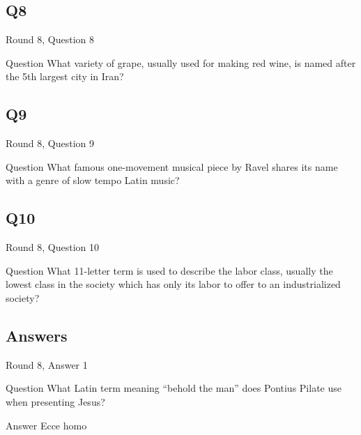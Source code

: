 \documentclass[11pt]{beamer}
\begin{document}
\subsection*{Q8}
\begin{frame}[t]{Round 8, Question 8}
\vspace{2em}
\begin{block}{Question}
What variety of grape, usually used for making red wine, is named after the 5th largest city in Iran\@?
\end{block}
\end{frame}
    

\subsection*{Q9}
\begin{frame}[t]{Round 8, Question 9}
\vspace{2em}
\begin{block}{Question}
What famous one-movement musical piece by Ravel shares its name with a genre of slow tempo Latin music\@?
\end{block}
\end{frame}
    

\subsection*{Q10}
\begin{frame}[t]{Round 8, Question 10}
\vspace{2em}
\begin{block}{Question}
What 11-letter term is used to describe the labor class, usually the lowest class in the society which has only its labor to offer to an industrialized society\@?
\end{block}
\end{frame}
    
\subsection{Answers}

\begin{frame}[t]{Round 8, Answer 1}
\vspace{2em}
\begin{block}{Question}
What Latin term meaning ``behold the man'' does Pontius Pilate use when presenting Jesus\@?
\end{block}
\pause{}
\begin{block}{Answer}
Ecce homo
\end{block}
\end{frame}
    
\end{document}
